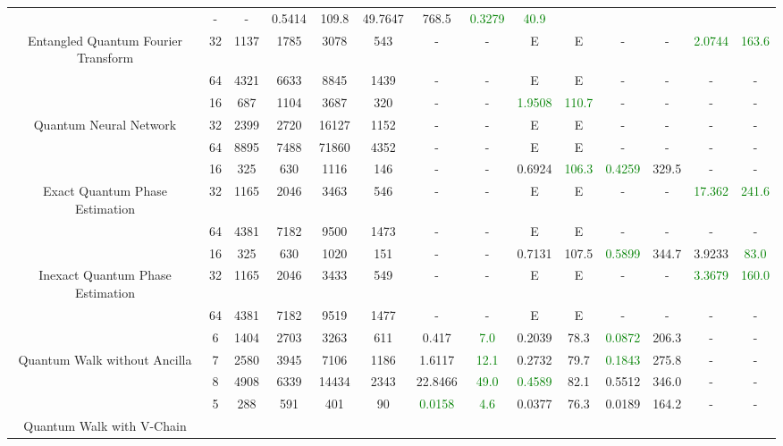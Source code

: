 \begin{table}[htb]
{\begin{tabular}{|c|c|c|c|c|c|c|c|c|c|c|c|c|c|}
 & - & -
 & 0.5414 & 109.8
 & 49.7647 & 768.5
 & \textcolor{green}{0.3279} & \textcolor{green}{40.9}
 \\
Entangled Quantum Fourier Transform & 
32 & 1137 & 1785 & 3078 & 543
 & - & -
 & E & E
 & - & -
 & \textcolor{green}{2.0744} & \textcolor{green}{163.6}
 \\
 & 
64 & 4321 & 6633 & 8845 & 1439
 & - & -
 & E & E
 & - & -
 & - & -
 \\
\hline
 & 
16 & 687 & 1104 & 3687 & 320
 & - & -
 & \textcolor{green}{1.9508} & \textcolor{green}{110.7}
 & - & -
 & - & -
 \\
Quantum Neural Network & 
32 & 2399 & 2720 & 16127 & 1152
 & - & -
 & E & E
 & - & -
 & - & -
 \\
 & 
64 & 8895 & 7488 & 71860 & 4352
 & - & -
 & E & E
 & - & -
 & - & -
 \\
\hline
 & 
16 & 325 & 630 & 1116 & 146
 & - & -
 & 0.6924 & \textcolor{green}{106.3}
 & \textcolor{green}{0.4259} & 329.5
 & - & -
 \\
Exact Quantum Phase Estimation & 
32 & 1165 & 2046 & 3463 & 546
 & - & -
 & E & E
 & - & -
 & \textcolor{green}{17.362} & \textcolor{green}{241.6}
 \\
 & 
64 & 4381 & 7182 & 9500 & 1473
 & - & -
 & E & E
 & - & -
 & - & -
 \\
\hline
 & 
16 & 325 & 630 & 1020 & 151
 & - & -
 & 0.7131 & 107.5
 & \textcolor{green}{0.5899} & 344.7
 & 3.9233 & \textcolor{green}{83.0}
 \\
Inexact Quantum Phase Estimation & 
32 & 1165 & 2046 & 3433 & 549
 & - & -
 & E & E
 & - & -
 & \textcolor{green}{3.3679} & \textcolor{green}{160.0}
 \\
 & 
64 & 4381 & 7182 & 9519 & 1477
 & - & -
 & E & E
 & - & -
 & - & -
 \\
\hline
 & 
6 & 1404 & 2703 & 3263 & 611
 & 0.417 & \textcolor{green}{7.0}
 & 0.2039 & 78.3
 & \textcolor{green}{0.0872} & 206.3
 & - & -
 \\
Quantum Walk without Ancilla & 
7 & 2580 & 3945 & 7106 & 1186
 & 1.6117 & \textcolor{green}{12.1}
 & 0.2732 & 79.7
 & \textcolor{green}{0.1843} & 275.8
 & - & -
 \\
 & 
8 & 4908 & 6339 & 14434 & 2343
 & 22.8466 & \textcolor{green}{49.0}
 & \textcolor{green}{0.4589} & 82.1
 & 0.5512 & 346.0
 & - & -
 \\
\hline
 & 
5 & 288 & 591 & 401 & 90
 & \textcolor{green}{0.0158} & \textcolor{green}{4.6}
 & 0.0377 & 76.3
 & 0.0189 & 164.2
 & - & -
 \\
Quantum Walk with V-Chain & 

\end{tabular}}
\end{table}
